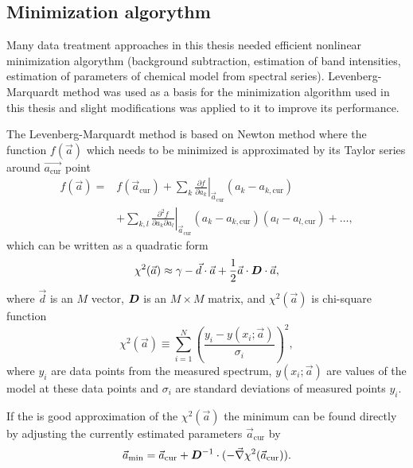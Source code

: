 \subsection{Minimization algorythm}
\label{minimization}

Many data treatment approaches in this thesis needed efficient nonlinear
minimization algorythm (background subtraction, estimation of band intensities,
estimation of parameters of chemical model from spectral series).
Levenberg-Marquardt method
\parencite{Marquardt1963}
was used as a basis for the minimization algorithm used in this thesis and
slight modifications was applied to it to improve its performance.

The Levenberg-Marquardt method is based on Newton method where
the function $f(\vec{a})$ which needs to be minimized is approximated by its
Taylor series around $\vec{a_\text{cur}}$ point
\begin{align*}
	f(\vec{a}) =& f(\vec{a}_\text{cur})
		+ \sum_k \left.\frac{\partial{}f}{\partial{}a_k}\right
			\rvert_{\vec{a}_\text{cur}}(a_k - a_{k,\text{cur}})\\
		&+ \sum_{k,l} \left.\frac{
			\partial^2f
		}{
			\partial{}a_k\partial{}a_l
		}\right\rvert_{\vec{a}_\text{cur}}
		(a_k - a_{k,\text{cur}})(a_l - a_{l,\text{cur}})
		+ \dots,
\end{align*}
which can be written as a quadratic form
\begin{equation}
	\chi^2(\vec{a}) \approx
		\gamma
		- \vec{d}\cdot\vec{a}
		+ \frac{1}{2}\vec{a}\cdot{}\mat{D}\cdot\vec{a},
	\label{\eqnlabel{minimization:chi_approx}}
\end{equation}
where $\vec{d}$ is an $M$ vector, $\bm{D}$ is an $M\times{}M$ matrix, and
$\chi^2(\vec{a})$ is chi-square function
\begin{equation*}
	\chi^2(\vec{a}) \equiv \sum_{i=1}^N\left(
			\frac{y_i - y(x_i;\vec{a})}{\sigma_i}
	\right)^2,
\end{equation*}
where $y_i$ are data points from the measured spectrum,
$y(x_i;\vec{a})$ are values of the model at these data points and
$\sigma_i$ are standard deviations of measured points $y_i$.

If the
is good approximation of the $\chi^2(\vec{a})$ the minimum can be found
directly by adjusting the currently estimated parameters $\vec{a}_\text{cur}$
by
\begin{equation}
	\vec{a}_\text{min} = \vec{a}_\text{cur}
		+ \mat{D}^{-1}\cdot(-\vec{\nabla}\chi^2(\vec{a}_\text{cur})).
	\label{\eqnlabel{minimization:newton_min}}
\end{equation}

